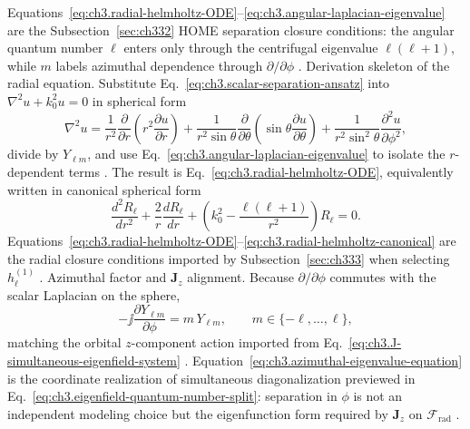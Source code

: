 Equations~\eqref{eq:ch3.radial-helmholtz-ODE}--\eqref{eq:ch3.angular-laplacian-eigenvalue} are the
Subsection~\ref{sec:ch332} HOME separation closure conditions: the angular quantum number \(\ell\) enters only
through the centrifugal eigenvalue \(\ell(\ell+1)\), while \(m\) labels azimuthal dependence through
\(\partial/\partial\phi\) \cite{jackson1999}.
Derivation skeleton of the radial equation. Substitute Eq.~\eqref{eq:ch3.scalar-separation-ansatz} into \(\nabla^{2}u+k_{0}^{2}u=0\) in spherical form
\begin{equation}
\label{eq:ch3.laplacian-spherical-form}
\nabla^{2}u
=
\frac{1}{r^{2}}\frac{\partial}{\partial r}\!\left(r^{2}\frac{\partial u}{\partial r}\right)
+\frac{1}{r^{2}\sin\theta}\frac{\partial}{\partial\theta}
\!\left(\sin\theta\frac{\partial u}{\partial\theta}\right)
+\frac{1}{r^{2}\sin^{2}\theta}\frac{\partial^{2}u}{\partial\phi^{2}},
\end{equation}
divide by \(Y_{\ell m}\), and use Eq.~\eqref{eq:ch3.angular-laplacian-eigenvalue} to isolate the
\(r\)-dependent terms \cite{jackson1999}. The result is Eq.~\eqref{eq:ch3.radial-helmholtz-ODE},
equivalently written in canonical spherical form
\begin{equation}
\label{eq:ch3.radial-helmholtz-canonical}
\frac{d^{2}R_{\ell}}{dr^{2}}
+\frac{2}{r}\frac{dR_{\ell}}{dr}
+\left(k_{0}^{2}-\frac{\ell(\ell+1)}{r^{2}}\right)R_{\ell}=0.
\end{equation}
Equations~\eqref{eq:ch3.radial-helmholtz-ODE}--\eqref{eq:ch3.radial-helmholtz-canonical} are the radial
closure conditions imported by Subsection~\ref{sec:ch333} when selecting \(h_{\ell}^{(1)}\) \cite{stratton1941}.
Azimuthal factor and \(\mathbf{J}_{z}\) alignment. Because \(\partial/\partial\phi\) commutes with the scalar Laplacian on the sphere,
\begin{equation}
\label{eq:ch3.azimuthal-eigenvalue-equation}
-\jj\frac{\partial Y_{\ell m}}{\partial\phi}=m\,Y_{\ell m},
\qquad
m\in\{-\ell,\ldots,\ell\},
\end{equation}
matching the orbital \(z\)-component action imported from Eq.~\eqref{eq:ch3.J-simultaneous-eigenfield-system}
\cite{jackson1999}. Equation~\eqref{eq:ch3.azimuthal-eigenvalue-equation} is the coordinate
realization of simultaneous diagonalization previewed in Eq.~\eqref{eq:ch3.eigenfield-quantum-number-split}:
separation in \(\phi\) is not an independent modeling choice but the eigenfunction form required by
\(\mathbf{J}_{z}\) on \(\mathcal{F}_{\mathrm{rad}}\) \cite{stratton1941}.
